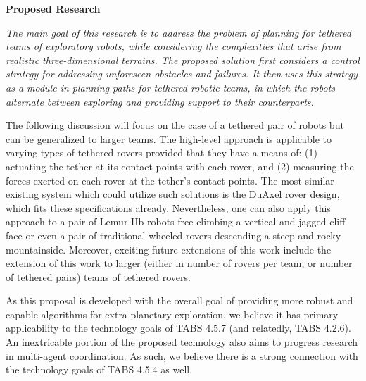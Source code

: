 \documentclass[12pt]{article}
\newcommand{\kostas}[1]{{\color{blue} #1}}
\begin{document}



{\bf\noindent Proposed Research}

{\sl The main goal of this research is to address the problem of
  planning for tethered teams of exploratory robots, while considering
  the complexities that arise from realistic three-dimensional
  terrains.  The proposed solution first considers a control strategy
  for addressing unforeseen obstacles and failures. It then uses this
  strategy as a module in planning paths for tethered robotic teams,
  in which the robots alternate between exploring and providing
  support to their counterparts.}

The following discussion will focus on the case of a tethered pair of
robots but can be generalized to larger teams. The high-level approach
is applicable to varying types of tethered rovers provided that they
have a means of: (1) actuating the tether at its contact points with
each rover, and (2) measuring the forces exerted on each rover at the
tether's contact points. The most similar existing system which could
utilize such solutions is the DuAxel rover design, which fits these
specifications already. Nevertheless, one can also apply this approach
to a pair of Lemur IIb robots free-climbing a vertical and jagged
cliff face or even a pair of traditional wheeled rovers descending a
steep and rocky mountainside. Moreover, exciting future extensions of this 
work include the extension of this work to larger (either in number of 
rovers per team, or number of tethered pairs) teams of tethered rovers.  

As this proposal is developed with the overall goal of providing more robust and 
capable algorithms for extra-planetary exploration, we believe it has primary 
applicability to the technology goals of TABS 4.5.7 (and relatedly, TABS 4.2.6). 
An inextricable portion of the proposed technology also aims to progress 
research in multi-agent coordination. As such, we believe there is a strong 
connection with the technology goals of TABS 4.5.4 as well.  
\end{document}
